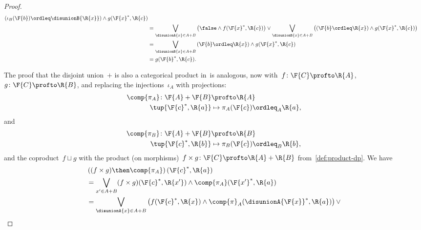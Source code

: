 \begin{proof}
\begin{equation}
\begin{aligned}
            \left(\iota_B(\F{b})\ordleq \disunionB{\R{x}}\right)\wedge  g(\F{x}^*,\R{c})                 \\
             & =\bigvee_{\disunionA{x} \in A+B}
            \left(\false \wedge  f(\F{x}^*,\R{c})\right) \vee \bigvee_{\disunionB{x} \in A+B}
            \left(\left(\F{b}\ordleq \R{x}\right) \wedge  g(\F{x}^*,\R{c}) \right)                       \\
             & =\bigvee_{\disunionB{x} \in A+B} \left(\F{b}\ordleq \R{x}\right) \wedge  g(\F{x}^*,\R{c}) \\
             & =g(\F{b}^*,\R{c}).
        \end{aligned}
    \end{equation}

    The proof that the disjoint union~$+$ is also a categorical product in~\DP is analogous, now with~$f \colon \F{C} \profto \R{A}$,~$g \colon \F{C} \profto \R{B}$, and replacing the injections~$\iota_A$ with projections:
    \begin{equation}
        \begin{aligned}
            \comp{\pi_A} \colon \F{A}+\F{B} & \profto \R{A}                        \\
            \tup{\F{c}^*,\R{a}}             & \mapsto \pi_A(\F{c})\ordleq_A \R{a},
        \end{aligned}
    \end{equation}
    and
    \begin{equation}
        \begin{aligned}
            \comp{\pi_B} \colon \F{A}+\F{B} & \profto \R{B}                        \\
            \tup{\F{c}^*,\R{b}}             & \mapsto \pi_B(\F{c})\ordleq_B \R{b},
        \end{aligned}
    \end{equation}
    and the coproduct~$f \sqcup g$ with the product (on morphisms)~$f \times g \colon \F{C} \profto \R{A} + \R{B}$ from~\cref{def:product-dp}.
    We have
    \begin{equation}
        \begin{aligned}
             & \left((f\times g)\then \comp{\pi_A}\right)(\F{c}^*,\R{a})                                                         \\
             & =\bigvee_{x'\in A+B} (f\times g)(\F{c}^*,\R{x'}) \wedge \comp{\pi_A}(\F{x'}^*,\R{a})                              \\
             & =\bigvee_{\disunionA{x}\in A+B}\left( f(\F{c}^*,\R{x}) \wedge \comp{\pi}_A(\disunionA{\F{x}}^*,\R{a})\right) \vee

\end{aligned}
\end{equation}
\end{proof}
